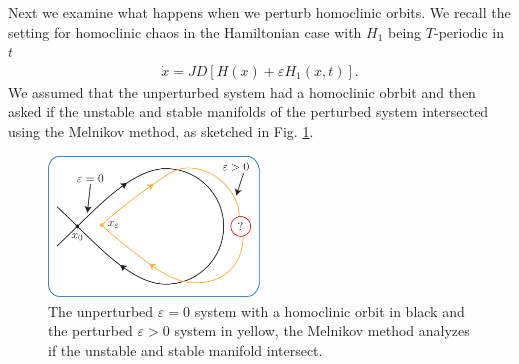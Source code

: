 Next we examine what happens when we perturb homoclinic orbits. We recall the setting for homoclinic chaos in the Hamiltonian case with $H_1$ being $T$-periodic in $t$
\begin{align}
	\dot{x} = JD[H(x) + \varepsilon H_{1}(x,t)].
\end{align}
We assumed that the unperturbed system had a homoclinic obrbit and then asked if the unstable and stable manifolds of the perturbed system intersected using the Melnikov method, as sketched in Fig. \ref{fig:ham_melnikov_method}.
\begin{figure}[h!]
	\centering
	\includegraphics[width=0.5\textwidth]{figures/ch8/8ham_melnikov_method.pdf}
	\caption{The unperturbed $\varepsilon=0$ system with a homoclinic orbit in black and the perturbed $\varepsilon>0$ system in yellow, the Melnikov method analyzes if the unstable and stable manifold intersect.}
	\label{fig:ham_melnikov_method}
\end{figure}

